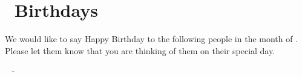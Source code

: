 \section{ \month \  Birthdays}

We would like to say Happy Birthday to the following people in the month of  \month . Please let them know that you are thinking of them on their special day.

\begin{multicols}{2}

%
{\birthday~ - \first~\last \\}%


\end{multicols}

